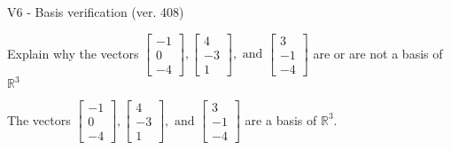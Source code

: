 \begin{exercise}
  \begin{exerciseTitle}V6 - Basis verification (ver. 408)\end{exerciseTitle}
  \begin{exerciseStatement}
    Explain why the vectors \(\left[\begin{array}{r}
-1 \\
0 \\
-4
\end{array}\right] , \left[\begin{array}{r}
4 \\
-3 \\
1
\end{array}\right] , \text{ and } \left[\begin{array}{r}
3 \\
-1 \\
-4
\end{array}\right]\) are or are not a basis of \(\mathbb{R}^3\)	


  \end{exerciseStatement}
  \begin{exerciseAnswer}
   The vectors \(\left[\begin{array}{r}
-1 \\
0 \\
-4
\end{array}\right] , \left[\begin{array}{r}
4 \\
-3 \\
1
\end{array}\right] , \text{ and } \left[\begin{array}{r}
3 \\
-1 \\
-4
\end{array}\right]\) 
  	 are  a basis of \(\mathbb{R}^3\).
  


  \end{exerciseAnswer}
\end{exercise}